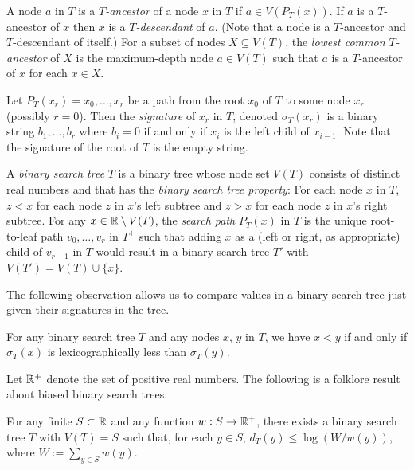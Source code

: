 \documentclass[10pt, conference, compsocconf]{IEEEtran}
\let\le\leqslant
\let\ge\geqslant
\begin{document}
A node $a$ in $T$ is a \emph{$T$-ancestor} of a node $x$ in $T$ if $a\in V(P_T(x))$. If $a$ is a $T$-ancestor of $x$ then $x$ is a \emph{$T$-descendant} of $a$. (Note that a node is a $T$-ancestor and $T$-descendant of itself.)  For a subset of nodes $X\subseteq V(T)$, the \emph{lowest common $T$-ancestor} of $X$ is the maximum-depth node $a\in V(T)$ such that $a$ is a $T$-ancestor of $x$ for each $x\in X$.

Let $P_T(x_r)=x_0,\dots,x_{r}$ be a path from the root $x_0$ of $T$ to some node $x_r$ (possibly $r=0$).  Then the \emph{signature} of $x_r$ in $T$, denoted $\sigma_T(x_r)$ is a binary string $b_1,\dots,b_r$ where $b_i=0$ if and only if $x_{i}$ is the left child of $x_{i-1}$.
Note that the signature of the root of $T$ is the empty string.

A \emph{binary search tree} $T$ is a binary tree whose node set $V(T)$ consists of distinct real numbers and that has the \emph{binary search tree property}:  For each node $x$ in $T$, $z<x$ for each node $z$ in $x$'s left subtree and $z>x$ for each node $z$ in $x$'s right subtree. For any $x\in\mathbb{R}\setminus V(T)$, the \emph{search path} $P_T(x)$ in $T$ is the unique root-to-leaf path $v_0,\dots,v_r$ in $T^+$ such that adding $x$ as a (left or right, as appropriate) child of $v_{r-1}$ in $T$ would result in a binary search tree $T'$ with $V(T')=V(T)\cup\{x\}$.

The following observation allows us to compare values in a binary search tree just given their signatures in the tree.

\begin{obs}
  For any binary search tree $T$ and any nodes $x$, $y$ in $T$, we have $x<y$ if and only if $\sigma_T(x)$ is lexicographically less than $\sigma_T(y)$.
\end{obs}

Let $\mathbb{R}^+$ denote the set of positive real numbers. The following is a folklore result about biased binary search trees. %

\begin{lem}
  For any finite $S\subset \mathbb{R}$ and any function $w:S\to\mathbb{R}^+$, there exists a binary search tree $T$ with $V(T)=S$ such that, for each $y\in S$, $d_T(y)\le\log(W/w(y))$, where $W:=\sum_{y\in S} w(y)$.
\end{lem}

\end{document}
